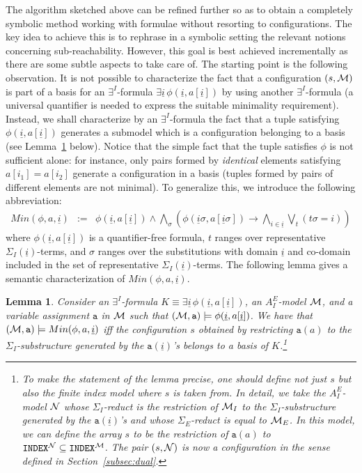 \documentclass{LMCS}
\newcommand{\ui}{\ensuremath{\underline i}}
\newcommand{\cM}{\ensuremath \mathcal M}
\newcommand{\cN}{\ensuremath \mathcal N}
\theoremstyle{plain}\newtheorem{assumption}[thm]{Assumption}
\theoremstyle{plain}\newtheorem{proposition}[thm]{Proposition}
\theoremstyle{plain}\newtheorem{property}[thm]{Property}
\theoremstyle{plain}\newtheorem{example}[thm]{Example}
\theoremstyle{plain}\newtheorem{claim}[thm]{Claim}
\theoremstyle{plain}\newtheorem{lemma}[thm]{Lemma}
\begin{document}
The algorithm sketched above can be refined further so as to obtain a
completely symbolic method working with formulae without resorting to
configurations.
The key idea to achieve this is to rephrase in a symbolic setting the
relevant notions concerning sub-reachability.  However, this goal is
best achieved incrementally as there are some subtle aspects to take
care of.  The starting point is the following observation.  It is not
possible to characterize the fact that a configuration $(s, \cM)$ is
part of a basis for an $\exists^I$-formula $\exists\ui\, \phi(\ui,
a[\ui])$ by using another $\exists^I$-formula (a universal quantifier
is needed to express the suitable minimality requirement).  Instead,
we shall characterize by an $\exists^I$-formula the fact that a tuple
satisfying $\phi(\ui, a[\ui])$ generates a submodel which is a
configuration belonging to a basis (see Lemma~\ref{lem:min} below).
Notice that the simple fact that the tuple satisfies $\phi$ is not
sufficient alone: for instance, only pairs formed by \emph{identical}
elements satisfying $a[i_1]=a[i_2]$ generate a configuration in a
basis (tuples formed by pairs of different elements are not minimal).
To generalize this, we introduce the following abbreviation:
\begin{eqnarray}
  \label{eq:mindef}
  Min(\phi, a,\ui) & := &
  \phi(\ui, a[\ui])\wedge
  \bigwedge_{\sigma} \left(\phi(\ui\sigma, a[\ui\sigma])\to
                     \bigwedge_{i\in \ui}\bigvee_t (t\sigma=i)\right)
\end{eqnarray}
where $\phi(\ui,a[\ui])$ is a quantifier-free formula, $t$ ranges over
representative $\Sigma_I(\ui)$-terms, and $\sigma$ ranges over the
substitutions with domain $\ui$ and co-domain included in the set of
representative $\Sigma_I(\ui)$-terms.  The following lemma gives a
semantic characterization of $Min(\phi, a,\ui)$.
\begin{lemma}
  \label{lem:min}
  Consider an $\exists^I$-formula $K\equiv \exists\ui\, \phi(\ui,
  a[\ui])$, an $A^E_I$-model $\cM$, and a variable assignment
  $\mathtt{a}$ in $\cM$ such that $(\cM, \mathtt{a})\models \phi(\ui,
  a[\ui])$.  We have that $(\cM, \mathtt{a})\models Min(\phi, a, \ui)$
  iff the configuration $s$ obtained by restricting $\mathtt{a}(a)$ to
  the $\Sigma_I$-substructure generated by the $\mathtt{a}(\ui)$'s
  belongs to a basis of $K$.\footnote{To make the statement of the
    lemma precise, one should define not just $s$ but also the finite
    index model where $s$ is taken from.  In detail, we take the
    $A^E_I$-model $\cN$ whose $\Sigma_I$-reduct is the restriction of
    $\cM_I$ to the $\Sigma_I$-substructure generated by the
    $\mathtt{a}(\ui)$'s and whose $\Sigma_E$-reduct is equal to
    $\cM_E$. In this model, we can define the array $s$ to be the
    restriction of $\mathtt{a}(a)$ to ${\tt INDEX}^{\cN}\subseteq {\tt
      INDEX}^{\cM}$.  The pair $(s,\cN)$ is now a configuration in the
    sense defined in Section~\ref{subsec:dual}.  }
\end{lemma}
\end{document}
